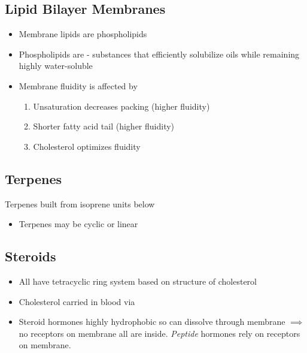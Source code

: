 \documentclass[../Bio_chemistryReview.tex]{subfiles}
\begin{document}
\subsection{Lipid Bilayer Membranes}

\begin{itemize}
  \item Membrane lipids are phospholipids 
  \item Phospholipids are
     - substances that efficiently solubilize oils while
    remaining highly water-soluble
  \item Membrane fluidity is affected by
    \begin{enumerate}
      \item Unsaturation decreases packing (higher fluidity)
      \item Shorter fatty acid tail (higher fluidity)
      \item Cholesterol optimizes fluidity
    \end{enumerate}
\end{itemize}

\subsection{Terpenes}

Terpenes built from isoprene units below

\begin{center}
  \setatomsep{2.3em}
  \setcrambond{4pt}{}{}
  \chemfig{
    -[1](-[2])=[7]-[1]
  }
\end{center}
\begin{itemize}
  \item Terpenes may be cyclic or linear 
\end{itemize}

\subsection{Steroids}

\begin{itemize}
  \item All have tetracyclic ring system based on structure of cholesterol
  \item Cholesterol carried in blood via 
  \item Steroid hormones highly hydrophobic so can dissolve through membrane
    $\implies$ no receptors on membrane all are inside. \emph{Peptide} hormones
    rely on receptors on membrane.  
\end{itemize}
\end{document}

